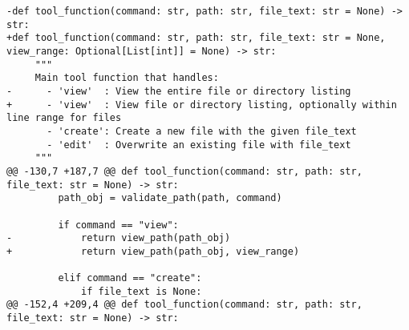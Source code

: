 \begin{lstlisting}[style=diffstyle]
-def tool_function(command: str, path: str, file_text: str = None) -> str:
+def tool_function(command: str, path: str, file_text: str = None, view_range: Optional[List[int]] = None) -> str:
     """
     Main tool function that handles:
-      - 'view'  : View the entire file or directory listing
+      - 'view'  : View file or directory listing, optionally within line range for files
       - 'create': Create a new file with the given file_text
       - 'edit'  : Overwrite an existing file with file_text
     """
@@ -130,7 +187,7 @@ def tool_function(command: str, path: str, file_text: str = None) -> str:
         path_obj = validate_path(path, command)
 
         if command == "view":
-            return view_path(path_obj)
+            return view_path(path_obj, view_range)
 
         elif command == "create":
             if file_text is None:
@@ -152,4 +209,4 @@ def tool_function(command: str, path: str, file_text: str = None) -> str:
 

\end{lstlisting}
